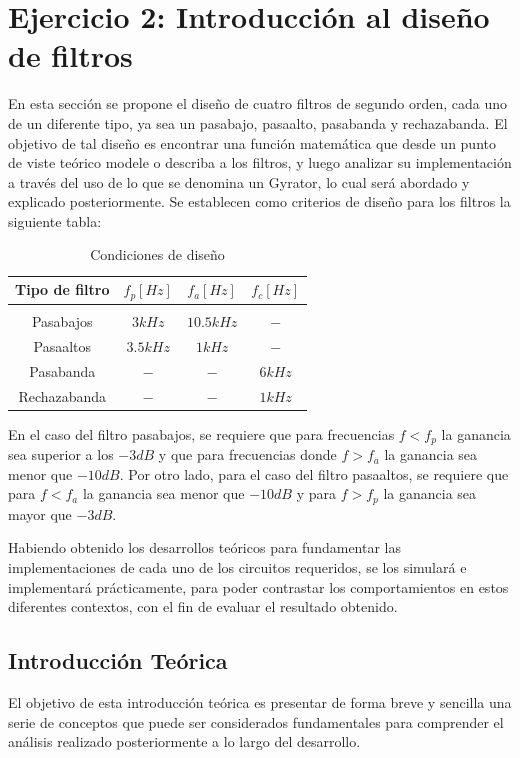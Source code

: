 \section{Ejercicio 2: Introducci\'on al dise\~no de filtros}
En esta secci\'on se propone el dise\~no de cuatro filtros de segundo orden, cada uno de un diferente tipo,
ya sea un pasabajo, pasaalto, pasabanda y rechazabanda. El objetivo de tal dise\~no es encontrar una funci\'on matem\'atica
que desde un punto de viste te\'orico modele o describa a los filtros, y luego analizar su implementaci\'on a trav\'es del uso de lo que se
denomina un Gyrator, lo cual ser\'a abordado y explicado posteriormente. Se establecen como criterios de dise\~no para los filtros la siguiente tabla:

\begin{table}[H]
    \centering
    \begin{tabular}{c c c c}
        Tipo de filtro & $f_p [Hz]$ & $f_a [Hz]$ & $f_c [Hz]$ \\
        \hline \\
        Pasabajos & $3kHz$ & $10.5kHz$ & $-$ \\
        Pasaaltos & $3.5kHz$ & $1kHz$ & $-$ \\
        Pasabanda & $-$ & $-$ & $6kHz$ \\
        Rechazabanda & $-$ & $-$ & $1kHz$ \\
        \hline
    \end{tabular}
    \caption{Condiciones de dise\~no}
\end{table}

En el caso del filtro pasabajos, se requiere que para frecuencias $f < f_p$ la ganancia sea superior a los $-3dB$ y que para frecuencias donde $f > f_a$ la ganancia
sea menor que $-10dB$. Por otro lado, para el caso del filtro pasaaltos, se requiere que para $f < f_a$ la ganancia sea menor que $-10dB$ y para $f > f_p$ la ganancia
sea mayor que $-3dB$.

Habiendo obtenido los desarrollos te\'oricos para fundamentar las implementaciones de cada uno de los circuitos requeridos, se los simular\'a e
implementar\'a pr\'acticamente, para poder contrastar los comportamientos en estos diferentes contextos, con el fin de evaluar el resultado obtenido.

\subsection{Introducci\'on Te\'orica}
El objetivo de esta introducci\'on te\'orica es presentar de forma breve y sencilla una serie de conceptos que puede ser considerados fundamentales
para comprender el an\'alisis realizado posteriormente a lo largo del desarrollo.

